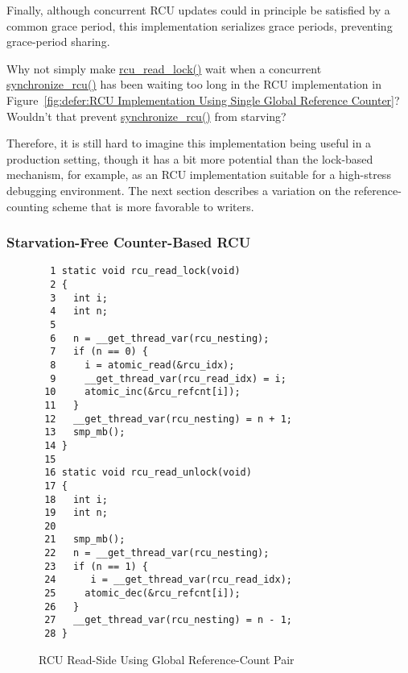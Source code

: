 Finally, although concurrent RCU updates could in principle be
satisfied by a common grace period, this implementation
serializes grace periods, preventing grace-period
sharing.

\QuickQuiz{}
	Why not simply make \url{rcu_read_lock()} wait when a concurrent
	\url{synchronize_rcu()} has been waiting too long in
	the RCU implementation in
	Figure~\ref{fig:defer:RCU Implementation Using Single Global Reference Counter}?
	Wouldn't that prevent \url{synchronize_rcu()} from starving?
 \QuickQuizEnd

Therefore, it is still hard to imagine this implementation being useful
in a production setting, though it has a bit more potential
than the lock-based mechanism, for example, as an RCU implementation
suitable for a high-stress debugging environment.
The next section describes a variation on the reference-counting
scheme that is more favorable to writers.

\subsubsection{Starvation-Free Counter-Based RCU}
\label{defer:Starvation-Free Counter-Based RCU}

\begin{figure}[tbp]
{ \scriptsize
\begin{verbatim}
  1 static void rcu_read_lock(void)
  2 {
  3   int i;
  4   int n;
  5 
  6   n = __get_thread_var(rcu_nesting);
  7   if (n == 0) {
  8     i = atomic_read(&rcu_idx);
  9     __get_thread_var(rcu_read_idx) = i;
 10     atomic_inc(&rcu_refcnt[i]);
 11   }
 12   __get_thread_var(rcu_nesting) = n + 1;
 13   smp_mb();
 14 }
 15 
 16 static void rcu_read_unlock(void)
 17 {
 18   int i;
 19   int n;
 20 
 21   smp_mb();
 22   n = __get_thread_var(rcu_nesting);
 23   if (n == 1) {
 24      i = __get_thread_var(rcu_read_idx);
 25     atomic_dec(&rcu_refcnt[i]);
 26   }
 27   __get_thread_var(rcu_nesting) = n - 1;
 28 }
\end{verbatim}
}
\caption{RCU Read-Side Using Global Reference-Count Pair}
\label{fig:defer:RCU Read-Side Using Global Reference-Count Pair}
\end{figure}

